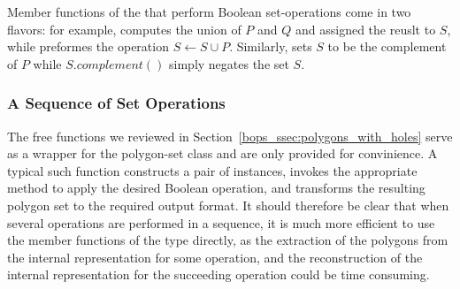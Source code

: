 Member functions of the  that perform
Boolean set-operations come in two flavors: for example, 
computes the union of $P$ and $Q$ and assigned the reuslt to $S$, while
 preformes the operation $S \longleftarrow S \cup P$.
Similarly,  sets $S$ to be the complement of $P$ while
$S.complement()$ simply negates the set $S$.

\subsubsection{A Sequence of Set Operations}
\label{bops_sssec:sequence}

The free functions we reviewed in Section~\ref{bops_ssec:polygons_with_holes}
serve as a wrapper for the polygon-set class and are only provided for
convinience. A typical such function constructs a pair of 
 instances, invokes the 
appropriate method to apply the desired Boolean operation, and transforms
the resulting polygon set to the required output format.
It should therefore be clear that when several operations are 
performed in a sequence, it is much more efficient to use the member 
functions of the  type directly, as the 
extraction of the polygons from the internal representation for some 
operation, and the reconstruction of the internal representation for 
the succeeding operation could be time consuming.

